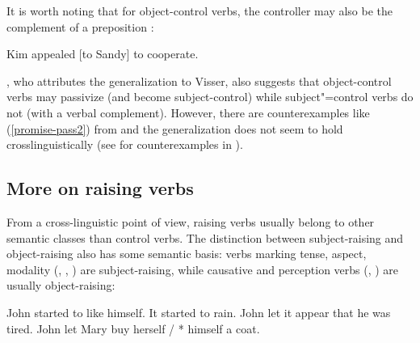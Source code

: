 It is worth noting that for object-control verbs, the controller may also be the complement of a preposition \citep[]{PollardandSag1994}:

\begin{exe}
\ex Kim appealed [to Sandy] to cooperate. \label{to}
\end{exe}


 
\citet[]{Bresnan1982}, who attributes the generalization to Visser, also suggests that
object-control verbs may passivize (and become subject-control) while subject"=control verbs do not
(with a verbal complement). However, there are counterexamples like (\ref{promise-pass2}) from \citet{JB1976a-u}\addpages and the generalization does not seem to
hold crosslinguistically (see  for counterexamples in ). 

\eal
{}\label{persuade-pass}
\label{promise-pass}
\label{promise-pass2}
\zl

 
\subsection{More on raising verbs}
\label{sec-more-on-raising-verbs}

From a cross-linguistic point of view, raising verbs usually belong to other semantic classes than
control verbs. The distinction between subject-raising and object-raising also has some semantic
basis: verbs marking tense, aspect, modality (, , ) are
subject-raising, while causative and perception verbs (, ) are usually
object-raising:

\eal
\ex John started to like himself.
\ex It started to rain.
\ex John let it appear that he was tired.
\ex John let Mary buy herself / * himself a coat.
\zl
	


